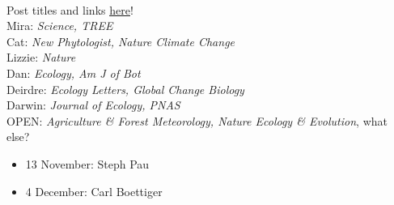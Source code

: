 \documentclass[11pt]{article}
\newenvironment{smitemize}{
\begin{itemize}
  \setlength{\itemsep}{0pt}
  \setlength{\parskip}{0.8pt}
  \setlength{\parsep}{0pt}}
{\end{itemize}
}
\begin{document}
\vspace{10pt}\\
 Post titles and links \href{https://docs.google.com/document/d/1j0WdDbjdp8ERLSO7whvtnP-tOblYMlX33TSCXy_uRKo/edit?usp=sharing}{\underline{here}}!\\
Mira: \emph{Science, TREE} \\
Cat: \emph{New Phytologist, Nature Climate Change}\\
Lizzie: \emph{Nature}\\
Dan: \emph{Ecology, Am J of Bot }\\
Deirdre: \emph{Ecology Letters, Global Change Biology}\\
Darwin: \emph{Journal of Ecology, PNAS}\\
OPEN: \emph{Agriculture \& Forest Meteorology, Nature Ecology \& Evolution}, what else?\\

\begin{smitemize}
\item 13 November: Steph Pau
\item 4 December: Carl Boettiger
\end{smitemize}
\end{document}
